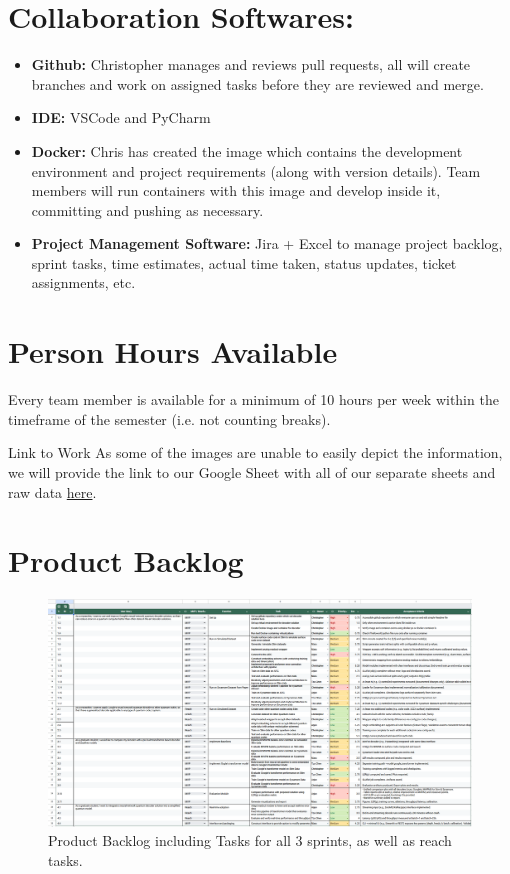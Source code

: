 \documentclass[12pt]{article}
\begin{document}
\maketitlepage

\section{Collaboration Softwares:}
\begin{itemize}
        \item \textbf{Github:} Christopher manages and reviews pull requests, all will create branches and work on assigned tasks before they are reviewed and merge.
        \item \textbf{IDE:} VSCode and PyCharm
        \item \textbf{Docker:} Chris has created the image which contains the development environment and project requirements (along with version details). Team members will run containers with this image and develop inside it, committing and pushing as necessary.
        \item \textbf{Project Management Software:} Jira + Excel to manage project backlog, sprint tasks, time estimates, actual time taken, status updates, ticket assignments, etc.
\end{itemize}

\section{Person Hours Available}
Every team member is available for a minimum of 10 hours per week within the timeframe of the semester (i.e. not counting breaks).

\begin{important}{Link to Work}
        As some of the images are unable to easily depict the information, we will provide the link to our
        Google Sheet with all of our separate sheets and raw data \href{https://docs.google.com/spreadsheets/d/1keQPuotPkZdqrqZ_ybHGJQ7_mYCZARqL/edit?usp=sharing&ouid=113464029339812046851&rtpof=true&sd=true}{here}.
\end{important}\label{link}

\section{Product Backlog}

\begin{figure}[H]
        \centering
        \includegraphics[width=1\linewidth]{images/Product_Backlog.png}
        \caption{Product Backlog including Tasks for all 3 sprints, as well as reach tasks.}
        \label{fig:1}
\end{figure}
\end{document}
